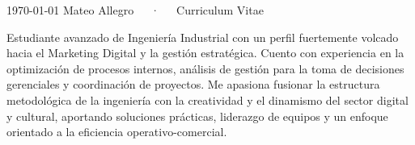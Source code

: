 \documentclass[11pt, a4paper]{awesome-cv}
\begin{document}
\makecvheader[C]

\makecvfooter
  {\today}
  {Mateo Allegro~~~·~~~Curriculum Vitae}
  {\thepage}




\begin{paragraph}
{Estudiante avanzado de Ingeniería Industrial con un perfil fuertemente volcado hacia el Marketing Digital y la gestión estratégica. Cuento con experiencia en la optimización de procesos internos, análisis de gestión para la toma de decisiones gerenciales y coordinación de proyectos. Me apasiona fusionar la estructura metodológica de la ingeniería con la creatividad y el dinamismo del sector digital y cultural, aportando soluciones prácticas, liderazgo de equipos y un enfoque orientado a la eficiencia operativo-comercial.}
\end{paragraph}


\end{document}
